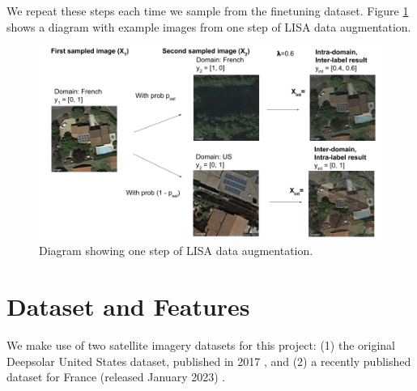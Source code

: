 \documentclass[10pt,twocolumn,letterpaper]{article}
\begin{document}
We repeat these steps each time we sample from the finetuning dataset. Figure \ref{fig:lisa} shows a diagram with example images from one step of LISA data augmentation.
\begin{figure}[htp]
\centering
\includegraphics[width=.7\linewidth]{lisa_viz.png}  
\captionsetup{justification=centering,margin=0cm}
\caption{Diagram showing one step of LISA data augmentation.}
\label{fig:lisa}
\end{figure}

\section{Dataset and Features}

We make use of two satellite imagery datasets for this project: (1) the original Deepsolar United States dataset, published in 2017 \cite{DeepSolar1}, and (2) a recently published dataset for France (released January 2023) \cite{Kasmi2023}.  
\end{document}
